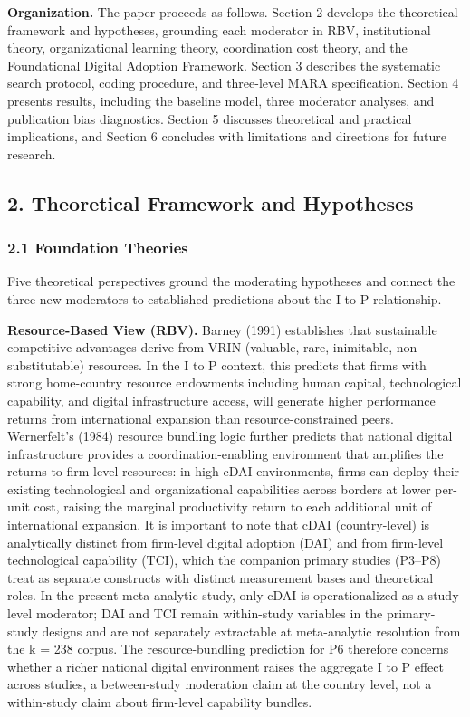 \documentclass[
  12pt,a4paper]{article}
\begin{document}
\textbf{Organization.} The paper proceeds as follows. Section 2 develops
the theoretical framework and hypotheses, grounding each moderator in
RBV, institutional theory, organizational learning theory, coordination
cost theory, and the Foundational Digital Adoption Framework. Section 3
describes the systematic search protocol, coding procedure, and
three-level MARA specification. Section 4 presents results, including
the baseline model, three moderator analyses, and publication bias
diagnostics. Section 5 discusses theoretical and practical implications,
and Section 6 concludes with limitations and directions for future
research.

\hypertarget{theoretical-framework-and-hypotheses}{%
\subsection{2. Theoretical Framework and
Hypotheses}\label{theoretical-framework-and-hypotheses}}

\hypertarget{foundation-theories}{%
\subsubsection{2.1 Foundation Theories}\label{foundation-theories}}

Five theoretical perspectives ground the moderating hypotheses and
connect the three new moderators to established predictions about the I
to P relationship.

\textbf{Resource-Based View (RBV).} Barney (1991) establishes that
sustainable competitive advantages derive from VRIN (valuable, rare,
inimitable, non-substitutable) resources. In the I to P context, this
predicts that firms with strong home-country resource endowments
including human capital, technological capability, and digital
infrastructure access, will generate higher performance returns from
international expansion than resource-constrained peers. Wernerfelt's
(1984) resource bundling logic further predicts that national digital
infrastructure provides a coordination-enabling environment that
amplifies the returns to firm-level resources: in high-cDAI
environments, firms can deploy their existing technological and
organizational capabilities across borders at lower per-unit cost,
raising the marginal productivity return to each additional unit of
international expansion. It is important to note that cDAI
(country-level) is analytically distinct from firm-level digital
adoption (DAI) and from firm-level technological capability (TCI), which
the companion primary studies (P3--P8) treat as separate constructs with
distinct measurement bases and theoretical roles. In the present
meta-analytic study, only cDAI is operationalized as a study-level
moderator; DAI and TCI remain within-study variables in the
primary-study designs and are not separately extractable at
meta-analytic resolution from the k = 238 corpus. The resource-bundling
prediction for P6 therefore concerns whether a richer national digital
environment raises the aggregate I to P effect across studies, a
between-study moderation claim at the country level, not a within-study
claim about firm-level capability bundles.
\end{document}
